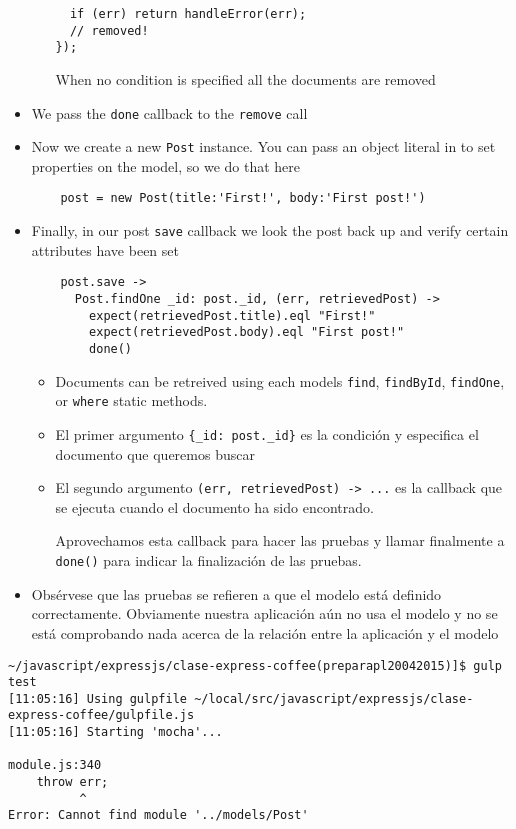 \begin{itemize}
\begin{itemize}
\begin{verbatim}
  if (err) return handleError(err);
  // removed!
});
\end{verbatim}
When no condition is specified all the documents are removed
\end{itemize}
\item  We pass the \verb|done| callback to the \verb|remove| call 
\item Now we create a new \verb|Post| instance.
You can pass an object literal in to set properties on the model, so we do that here
\begin{verbatim}
    post = new Post(title:'First!', body:'First post!')
\end{verbatim}
\item Finally, in our post \verb|save| callback we look the post back up and verify certain attributes have been set
\begin{verbatim}
    post.save ->
      Post.findOne _id: post._id, (err, retrievedPost) ->
        expect(retrievedPost.title).eql "First!"
        expect(retrievedPost.body).eql "First post!"
        done()
\end{verbatim}
\begin{itemize}
\item
Documents can be retreived using each models 
\verb|find|, \verb|findById|, \verb|findOne|, or \verb|where| 
static methods.
\item
El primer argumento \verb|{_id: post._id}| es la condición y especifica el documento que 
queremos buscar
\item
El segundo argumento \verb|(err, retrievedPost) -> ...| es la callback que se ejecuta
cuando el documento ha sido encontrado. 

Aprovechamos esta callback para hacer
las pruebas y llamar finalmente a \verb|done()| para indicar la finalización de las pruebas.
\end{itemize}
\item Obsérvese que las pruebas se refieren a que el modelo
está definido correctamente. Obviamente nuestra aplicación aún no usa el modelo
y no se está comprobando nada acerca de la relación entre la aplicación y el modelo
\end{itemize}
\begin{verbatim}
~/javascript/expressjs/clase-express-coffee(preparapl20042015)]$ gulp test
[11:05:16] Using gulpfile ~/local/src/javascript/expressjs/clase-express-coffee/gulpfile.js
[11:05:16] Starting 'mocha'...

module.js:340
    throw err;
          ^
Error: Cannot find module '../models/Post'

\end{verbatim}

